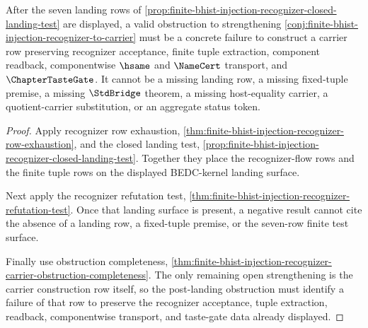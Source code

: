 \begin{theorem}
\label{thm:finite-bhist-injection-recognizer-construction-obstruction-localization}
After the seven landing rows of \autoref{prop:finite-bhist-injection-recognizer-closed-landing-test} are displayed, a valid obstruction to strengthening \autoref{conj:finite-bhist-injection-recognizer-to-carrier} must be a concrete failure to construct a carrier row preserving recognizer acceptance, finite tuple extraction, component readback, componentwise $\hsame$ and $\NameCert$ transport, and $\ChapterTasteGate$. It cannot be a missing landing row, a missing fixed-tuple premise, a missing $\StdBridge$ theorem, a missing host-equality carrier, a quotient-carrier substitution, or an aggregate status token.
\end{theorem}
\begin{proof}
Apply recognizer row exhaustion, \autoref{thm:finite-bhist-injection-recognizer-row-exhaustion}, and the closed landing test, \autoref{prop:finite-bhist-injection-recognizer-closed-landing-test}. Together they place the recognizer-flow rows and the finite tuple rows on the displayed BEDC-kernel landing surface.

Next apply the recognizer refutation test, \autoref{thm:finite-bhist-injection-recognizer-refutation-test}. Once that landing surface is present, a negative result cannot cite the absence of a landing row, a fixed-tuple premise, or the seven-row finite test surface.

Finally use obstruction completeness, \autoref{thm:finite-bhist-injection-recognizer-carrier-obstruction-completeness}. The only remaining open strengthening is the carrier construction row itself, so the post-landing obstruction must identify a failure of that row to preserve the recognizer acceptance, tuple extraction, readback, componentwise transport, and taste-gate data already displayed.
\end{proof}

